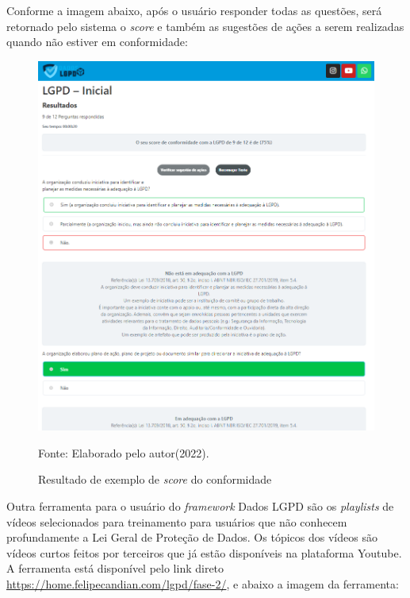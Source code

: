\documentclass[
	12pt,				%
	openright,			%
	oneside,			%
	a4paper,			%
	english,			%
	french,				%
	spanish,			%
	brazil,				%
	]{abntex2}
\begin{document}
\pagebreak

Conforme a imagem abaixo, após o usuário responder todas as questões, será retornado pelo sistema o \textit{score} e também as sugestões de ações a serem realizadas quando não estiver em conformidade:
\begin{figure}[ht]
    \centering
    \caption{Resultado de exemplo de \textit{score} do conformidade }
    \includegraphics[width=6.8in]{Images/resultado.png}
    \label{fig: resultado}
    
    \centering \small Fonte: Elaborado pelo autor(2022).
\end{figure}

\pagebreak

Outra ferramenta para o usuário do \textit{framework} Dados LGPD são os \textit{playlists} de vídeos selecionados para treinamento para usuários que não conhecem profundamente a Lei Geral de Proteção de Dados. Os tópicos dos vídeos são vídeos curtos feitos por terceiros que já estão disponíveis na plataforma Youtube.
A ferramenta está disponível pelo link direto \url{https://home.felipecandian.com/lgpd/fase-2/}, e abaixo a imagem da ferramenta:
\end{document}
